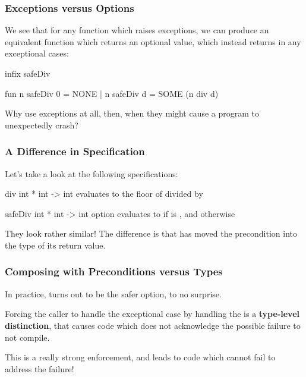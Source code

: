 \documentclass[aspectratio=169]{beamer}
\begin{document}
\begin{frame}[fragile]
  \frametitle{Exceptions versus Options}

  We see that for any function which raises exceptions, we can produce
  an equivalent function which returns an optional value, which instead
  returns  in any exceptional cases:

  \pause
  \begin{codeblock}
    infix safeDiv

    fun n safeDiv 0 = NONE
      | n safeDiv d = SOME (n div d)
  \end{codeblock}

  \pause
  \vspace{\fill}

  Why use exceptions at all, then, when they might cause a program to
  unexpectedly crash?
\end{frame}

\begin{frame}[fragile]
  \frametitle{A Difference in Specification}

  Let's take a look at the following specifications:

  \pause
  \spec
    {div}
    {int * int -> int}
    {}
    { evaluates to the
    floor of  divided by }

  \pause
  \spec
    {safeDiv}
    {int * int -> int option}
    {}
    { evaluates to  if  is ,
    and  otherwise}

  \pause
  They look rather similar! The difference is that  has
  moved the precondition into the type of its return value.
\end{frame}

\begin{frame}[fragile]
  \frametitle{Composing with Preconditions versus Types}

  \tgs

  In practice,  turns out to be the safer option,
  to no surprise.

  \pause
  \vspace{\fill}

  Forcing the caller to handle the exceptional case by handling the
   is a \textbf{type-level distinction}, that causes code which
  does not acknowledge the possible failure to not compile.

  \pause
  \vspace{\fill}

  This is a really strong enforcement, and leads to code which cannot
  fail to address the failure!
\end{frame}
\end{document}
